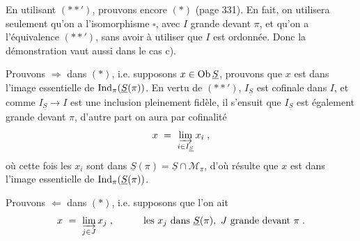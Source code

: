 En utilisant $(**')$, prouvons encore $(*)$ (page 331). En fait, on utilisera seulement qu'on a
l'isomorphisme $\square$, avec $I$ grande devant $\pi$, et qu'on a l'équivalence $(**')$, sans avoir à utiliser que $I$ est ordonnée. Donc la démonstration vaut aussi dans le cas c).

Prouvons $\Longrightarrow$ dans $(*)$, i.e. supposons $x \in \operatorname{Ob}\underline{S}$, prouvons que $x$ est dans l'image essentielle de $\operatorname{Ind}_\pi(\underline{S}(\pi))$. En vertu de $(**')$, $I_{\underline{S}}$ est cofinale dans $I$, et comme $I_{\underline{S}} \longrightarrow I$ est une inclusion pleinement fidèle, il s'ensuit que $I_{\underline{S}}$ est également grande devant $\pi$, d'autre part on aura par cofinalité
\[
x \ = \ \varinjlim_{i\in I_{\underline{S}}} x_i \; ,
\]
où cette fois les $x_i$ sont dans $\underline{S}(\pi) = \underline{S}\cap\mathcal{M}_\pi$, d'où résulte que $x$ est dans l'image essentielle de $\operatorname{Ind}_\pi(\underline{S}(\pi))$.

Prouvons $\Longleftarrow$ dans $(*)$, i.e. supposons que l'on ait
\[
x \ = \ \varinjlim_{j\in J} x_j \; , \qquad\quad \text{les } x_j \text{ dans } \underline{S}(\pi),\ J \text{ grande devant } \pi \; .
\]



